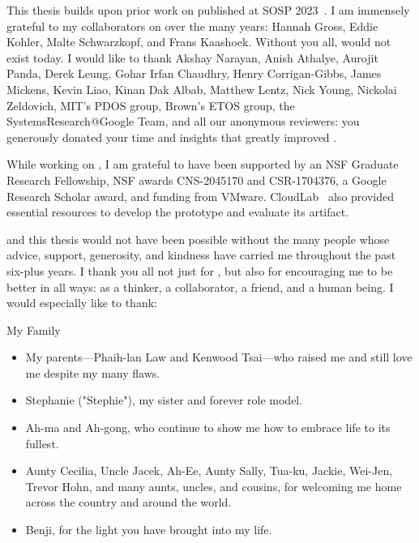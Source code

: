 %
This thesis builds upon prior work on \sys published at SOSP 2023~\cite{edna}.
I am immensely grateful to my collaborators on \sys over the many years: Hannah
Gross, Eddie Kohler, Malte Schwarzkopf, and Frans Kaashoek. Without you all,
\sys would not exist today.
%
I would like to thank Akshay Narayan, Anish Athalye, Aurojit Panda, Derek
Leung, Gohar Irfan Chaudhry, Henry Corrigan-Gibbs, James Mickens, Kevin Liao,
Kinan Dak Albab, Matthew Lentz, Nick Young, Nickolai Zeldovich, MIT's PDOS
group, Brown's ETOS group, the SystemsResearch@Google Team, and all our
anonymous reviewers: you generously donated your time and insights that greatly
improved \sys. 
%

%
While working on \sys, I am grateful to have been supported by an NSF Graduate
Research Fellowship, NSF awards CNS-2045170 and CSR-1704376, a Google Research
Scholar award, and funding from VMware.
%
CloudLab~\cite{cloudlab} also provided essential resources
to develop the \sys prototype and evaluate its artifact.
%

%
\sys and this thesis would not have been possible without the many people whose
advice, support, generosity, and kindness have carried me throughout the past
six-plus years.
%
I thank you all not just for \sys, but also for encouraging me to be better in
all ways: as a thinker, a collaborator, a friend, and a human being.
%
I would especially like to thank:

\begin{center}{My Family}\end{center}
    \begin{itemize}
    \item My parents---Phaih-lan Law and Kenwood Tsai---who raised me and still love me despite my many flaws. 
    
    \item Stephanie ("Stephie"), my sister and forever role model. 
     
     \item Ah-ma and Ah-gong, who continue to show me how to embrace life to its fullest. 
        
    \item Aunty Cecilia, Uncle Jacek, Ah-Ee, Aunty Sally, Tua-ku, Jackie,
        Wei-Jen, Trevor Hohn, and many aunts, uncles, and cousins, for welcoming
            me home across the country and around the world.

    \item Benji, for the light you have brought into my life.
    \end{itemize}

